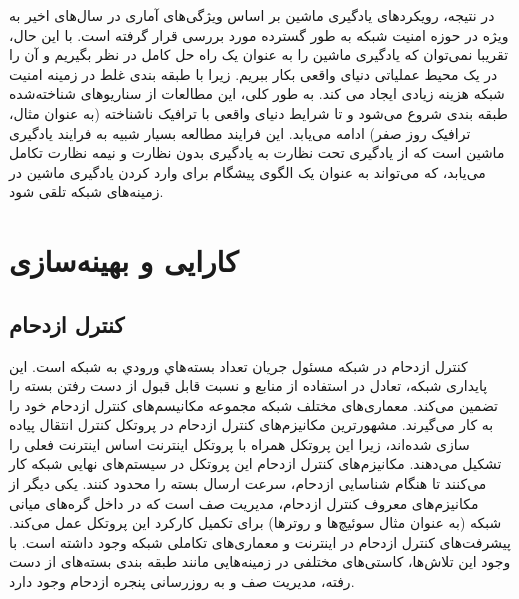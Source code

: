 \newpage

در نتیجه، رویکردهای یادگیری ماشین بر اساس ویژگی‌های آماری در سال‌های اخیر به ویژه در حوزه امنیت شبکه به طور گسترده مورد بررسی قرار گرفته است. با این حال، تقریبا نمی‌توان که یادگیری ماشین را به عنوان یک راه حل کامل در نظر بگیریم و آن را در یک محیط عملیاتی دنیای واقعی بکار ببریم. زیرا با طبقه بندی غلط در زمینه امنیت شبکه هزینه زیادی ایجاد می کند. به طور کلی، این مطالعات از سناریوهای شناخته‌شده طبقه بندی شروع می‌شود و تا شرایط دنیای واقعی با ترافیک ناشناخته (به عنوان مثال، ترافیک روز صفر) ادامه می‌یابد. این فرایند مطالعه بسیار شبیه به فرایند یادگیری ماشین است که از یادگیری تحت نظارت به یادگیری بدون نظارت و نیمه نظارت تکامل می‌یابد، که می‌تواند به عنوان یک الگوی پیشگام برای وارد کردن یادگیری ماشین در زمینه‌های شبکه تلقی شود.


\section{کارایی و بهینه‌سازی}
\subsection{کنترل ازدحام}

كنترل ازدحام در شبكه مسئول جریان تعداد بسته‌هاي ورودي به شبكه است. این پایداری شبکه، تعادل در استفاده از منابع و نسبت قابل قبول از دست رفتن بسته را تضمین می‌کند. معماری‌های مختلف شبکه مجموعه مکانیسم‌های کنترل ازدحام خود را به کار می‌گیرند. مشهورترین مکانیزم‌های کنترل ازدحام در پروتکل کنترل انتقال پیاده سازی شده‌اند، زیرا این پروتکل همراه با پروتکل اینترنت اساس اینترنت فعلی را تشکیل می‌دهند. مکانیزم‌های کنترل ازدحام این پروتکل در سیستم‌های نهایی شبکه کار می‌کنند تا هنگام شناسایی ازدحام، سرعت ارسال بسته را محدود کنند. یکی دیگر از مکانیزم‌های معروف کنترل ازدحام، مدیریت صف است که در داخل گره‌های میانی شبکه (به عنوان مثال سوئیچ‌ها و روترها) برای تکمیل کارکرد این پروتکل عمل می‌کند. پیشرفت‌های کنترل ازدحام در اینترنت و معماری‌های تکاملی شبکه وجود داشته است. با وجود این تلاش‌ها، کاستی‌های مختلفی در زمینه‌هایی مانند طبقه بندی بسته‌های از دست رفته، مدیریت صف و به روزرسانی پنجره ازدحام وجود دارد\cite{boutaba2018comprehensive}.
\newpage




